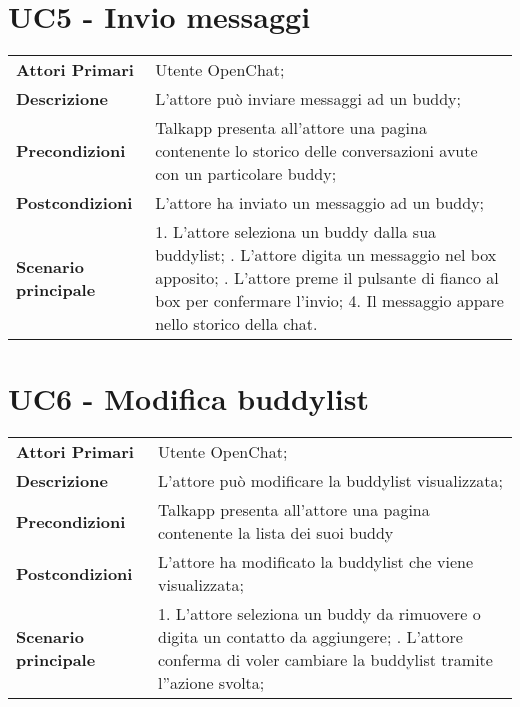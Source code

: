 
\section{UC5 - Invio messaggi}
	\begin{center}
	\bgroup
	\def\arraystretch{1.8}     
	\begin{longtable}{  p{4cm} | p{9.5cm} } 
		\textbf{Attori Primari} & Utente OpenChat; \\ 
		\textbf{Descrizione} &  L'attore può inviare messaggi ad un buddy; \\ 
		\textbf{Precondizioni}  & Talkapp presenta all'attore una pagina contenente lo storico delle conversazioni avute con un particolare buddy; \\
		\textbf{Postcondizioni} & L'attore ha inviato un messaggio ad un buddy; \\ 
		\textbf{Scenario principale} & 
		1. L'attore seleziona un buddy dalla sua buddylist; \newline
		2. L'attore digita un messaggio nel box apposito; \newline
		3. L'attore preme il pulsante di fianco al box per confermare l'invio;
		4. Il messaggio appare nello storico della chat.
	\end{longtable}
	\egroup
\end{center}

\section{UC6 - Modifica buddylist}
	\begin{center}
	\bgroup
	\def\arraystretch{1.8}     
	\begin{longtable}{  p{4cm} | p{9.5cm} } 
		\textbf{Attori Primari} & Utente OpenChat; \\ 
		\textbf{Descrizione} &  L'attore può modificare la buddylist visualizzata; \\ 
		\textbf{Precondizioni}  & Talkapp presenta all'attore una pagina contenente la lista dei suoi buddy \\
		\textbf{Postcondizioni} & L'attore ha modificato la buddylist che viene visualizzata; \\ 
		\textbf{Scenario principale} & 
		1. L'attore seleziona un buddy da rimuovere o digita un contatto da aggiungere; \newline
		2. L'attore conferma di voler cambiare la buddylist tramite l''azione svolta;
	\end{longtable}
	\egroup
\end{center}


